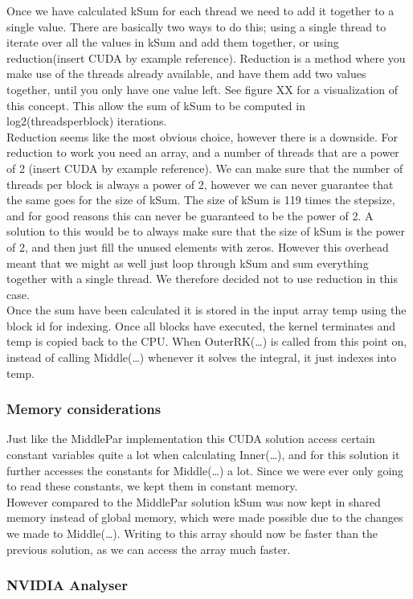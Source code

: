 Once we have calculated kSum for each thread we need to add it together to a single value. There are basically two ways to do this; using a single thread to iterate over all the values in kSum and add them together, or using reduction(insert CUDA by example reference). Reduction is a method where you make use of the threads already available, and have them add two values together, until you only have one value left. See figure XX for a visualization of this concept. This allow the sum of kSum to be computed in log2(threadsperblock) iterations.\\

Reduction seems like the most obvious choice, however there is a downside. For reduction to work you need an array, and a number of threads that are a power of 2 (insert CUDA by example reference). We can make sure that the number of threads per block is always a power of 2, however we can never guarantee that the same goes for the size of kSum. The size of kSum is 119 times the stepsize, and for good reasons this can never be guaranteed to be the power of 2. A solution to this would be to always make sure that the size of kSum is the power of 2, and then just fill the unused elements with zeros. However this overhead meant that we might as well just loop through kSum and sum everything together with a single thread. We therefore decided not to use reduction in this case.\\

Once the sum have been calculated it is stored in the input array temp using the block id for indexing. Once all blocks have executed, the kernel terminates and temp is copied back to the CPU. When OuterRK(…) is called from this point on, instead of calling Middle(…) whenever it solves the integral, it just indexes into temp.

\subsubsection{Memory considerations} \hfill
Just like the MiddlePar implementation this CUDA solution access certain constant variables quite a lot when calculating Inner(…), and for this solution it further accesses the constants for  Middle(…) a lot. Since we were ever only going to read these constants, we kept them in constant memory.\\

However compared to the MiddlePar solution kSum was now kept in shared memory instead of global memory, which were made possible due to the changes we made to Middle(…). Writing to this array should now be faster than the previous solution, as we can access the array much faster.

\subsubsection{NVIDIA Analyser} \hfill
